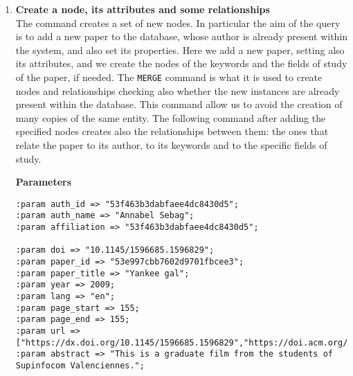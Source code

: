 \begin{enumerate}
    \item \textbf{Create a node, its attributes and some relationships}\\
    The command creates a set of new nodes.
    In particular the aim of the query is to add a new paper to the database, whose author is already present within the system, and also set its properties.
    Here we add a new paper, setting also its attributes, and we create the nodes of the keywords and the fields of study of the paper, if needed.
    The \verb|MERGE| command is what it is used to create nodes and relationships checking also whether the new instances are already present within the database.
    This command allow us to avoid the creation of many copies of the same entity.
    The following command after adding the specified nodes creates also the relationships between them: the ones that relate the paper to its author, to its keywords and to the specific fields of study.

    \textbf{Parameters}
    \begin{lstlisting}[label={lst:lstlisting8}]
:param auth_id => "53f463b3dabfaee4dc8430d5";
:param auth_name => "Annabel Sebag";
:param affiliation => "53f463b3dabfaee4dc8430d5";

:param doi => "10.1145/1596685.1596829";
:param paper_id => "53e997cbb7602d9701fbcee3";
:param paper_title => "Yankee gal";
:param year => 2009;
:param lang => "en";
:param page_start => 155;
:param page_end => 155;
:param url => ["https://dx.doi.org/10.1145/1596685.1596829","https://doi.acm.org/10.1145/1596685.1596829","db/conf/siggraph/siggraph2009festival.html#Sebag09c","https://doi.org/10.1145/1596685.1596829"];
:param abstract => "This is a graduate film from the students of Supinfocom Valenciennes.";


\end{lstlisting}
\end{enumerate}
